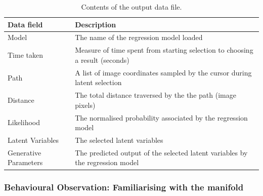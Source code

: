 \documentclass[ %
author={Dillon Keith Diep},
supervisor={Dr. Carl Henrik Ek},
degree={MEng},
title={ART-CG:},
subtitle={Assisted Real-time Content Generation of 3D Hair by Learning Manifolds},
type={Research},
year={2017} ]{dissertation}
\begin{document}
\begin{table}[!h]
	\centering
	\caption{Contents of the output data file.}
	\begin{tabular}{|l|l|}
		\hline
		Data field 				& Description\\
		\hline
		Model 					& The name of the regression model loaded\\
		\hline
		Time taken				& Measure of time spent from starting selection to choosing a result (seconds)\\
		\hline
		Path 					& A list of image coordinates sampled by the cursor during latent selection\\
		\hline
		Distance 				& The total distance traversed by the the path (image pixels)\\
		\hline
		Likelihood				& The normalised probability associated by the regression model\\
		\hline
		Latent Variables		& The selected latent variables\\
		\hline
		Generative Parameters 	& The predicted output of the selected latent variables by the regression model\\
		\hline
	\end{tabular}
	\label{outputfile}
\end{table}

\subsubsection{Behavioural Observation: Familiarising with the manifold}
\end{document}
